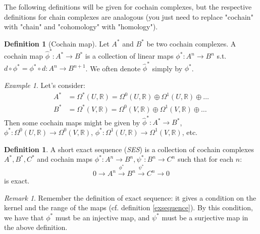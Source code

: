 \documentclass[a4paper,11pt,titlepage, article, oneside]{memoir}
\numberwithin{equation}{section}
\theoremstyle{definition}
\newtheorem{definition}[theorem]{Definition}
\theoremstyle{remark}
\newtheorem{remark}[theorem]{Remark}
\newtheorem{example}[theorem]{Example}
\newcommand{\rfield}{\mathbb{R}}
\begin{document}
The following definitions will be given for cochain complexes, but the respective definitions for chain complexes are analogous (you just need to replace "cochain" with "chain" and "cohomology" with "homology").

\begin{definition}[Cochain map] 
  Let $A^*$ and $B^*$ be two cochain complexes.
  A cochain map $\hat \phi^* \colon A^* \rightarrow B^*$ is a collection of linear maps $\phi^* \colon A^n \rightarrow B^n$ s.t. $d \circ \phi^* = \phi^* \circ d \colon A^n \rightarrow B^{n+1}$. We often denote $\hat \phi^*$ simply by $\phi^*$.
\end{definition}

\begin{tcolorbox}\begin{example}
  Let's consider:
  \begin{align*}
    A^* &= \Omega^*(U, \rfield) = \Omega^0(U, \rfield) \oplus \Omega^1(U, \rfield) \oplus \ldots \\
    B^* &= \Omega^*(V, \rfield) = \Omega^0(V, \rfield) \oplus \Omega^1(V, \rfield) \oplus \ldots
  \end{align*}
  Then some cochain maps might be given by $\hat \phi^*\colon A^* \rightarrow B^*$, $\phi^* \colon \Omega^0(U, \rfield) \rightarrow \Omega^0(V, \rfield)$, $\phi^* \colon \Omega^1(U, \rfield) \rightarrow \Omega^1(V, \rfield)$, etc.
\end{example}\end{tcolorbox}

\begin{definition}
  A short exact sequence (\textit{SES}) is a collection of cochain complexes $A^*, B^*, C^*$ and cochain maps $\phi^* \colon A^n \rightarrow B^n, \psi^* \colon B^n \rightarrow C^n$ such that for each $n$:
  \begin{equation}
    0 \longrightarrow A^n \overset{\phi^*}{\longrightarrow} B^n \overset{\psi^*}{\longrightarrow} C^n \longrightarrow 0
  \end{equation}
  is exact.
\end{definition}

\begin{remarkbox}\begin{remark}
  Remember the definition of exact sequence: it gives a condition on the kernel and the range of the maps (cf. definition \ref{exsequence}).
  By this condition, we have that $\phi^*$ must be an injective map, and $\psi^*$ must be a surjective map in the above definition.
\end{remark}\end{remarkbox}
\end{document}
